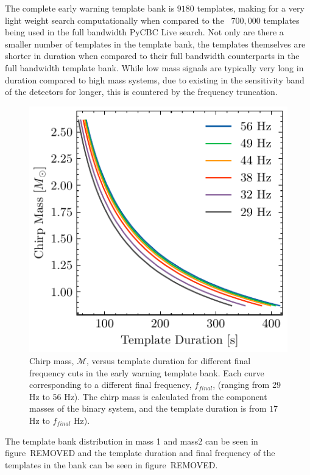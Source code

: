 The complete early warning template bank is $9180$ templates, making for a very light weight search computationally when compared to the ~$700,000$ templates being used in the full bandwidth PyCBC Live search. Not only are there a smaller number of templates in the template bank, the templates themselves are shorter in duration when compared to their full bandwidth counterparts in the full bandwidth template bank. While low mass signals are typically very long in duration compared to high mass systems, due to existing in the sensitivity band of the detectors for longer, this is countered by the frequency truncation.
%
\begin{figure}
    \centering
    \includegraphics[width=\textwidth]{images/6_earlywarning/search/template_bank_mchirp_duration.pdf}
    \caption{Chirp mass, $\mathcal{M}$, versus template duration for different final frequency cuts in the early warning template bank. Each curve corresponding to a different final frequency, $f_{final}$, (ranging from 29 Hz to 56 Hz). The chirp mass is calculated from the component masses of the binary system, and the template duration is from $17$ Hz to $f_{final}$ Hz).}
    \label{6:fig:tb_mchirp_duration}
\end{figure}
%
The template bank distribution in mass 1 and mass2 can be seen in figure~REMOVED and the template duration and final frequency of the templates in the bank can be seen in figure~REMOVED.

